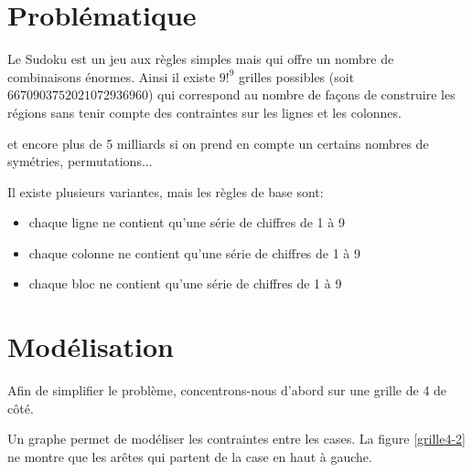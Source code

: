\documentclass[a4paper,11pt]{article}
\begin{document}
\begin{Form}
\section{Problématique}
Le Sudoku est un jeu aux règles simples mais qui offre un nombre de combinaisons énormes. Ainsi il existe $9!^9$ grilles possibles (soit $6 670 903 752 021 072 936 960$) qui correspond au nombre de façons de construire les régions sans tenir compte des contraintes sur les lignes et les colonnes. 
\begin{commentprof}
et encore plus de 5 milliards si on prend en compte un certains nombres de symétries, permutations...
\end{commentprof}
Il existe plusieurs variantes, mais les règles de base sont:
\begin{itemize}
\item chaque ligne ne contient qu'une série de chiffres de 1 à 9
\item chaque colonne ne contient qu'une série de chiffres de 1 à 9
\item chaque bloc ne contient qu'une série de chiffres de 1 à 9
\end{itemize}
\begin{center}
\end{center}
\section{Modélisation}
Afin de simplifier le problème, concentrons-nous d'abord sur une grille de 4 de côté.
\begin{center}
\label{grille4}
\end{center}
Un graphe permet de modéliser les contraintes entre les cases. La figure \ref{grille4-2} ne montre que les arêtes qui partent de la case en haut à gauche. 
\begin{center}
\end{center}
\end{Form}
\end{document}
